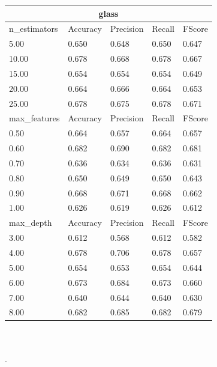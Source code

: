 \documentclass[12pt,a4paper]{article}
\begin{document}
\begin{tabular}{ |p{3cm}||p{2cm}|p{2cm}|p{2cm}|p{2cm}| }
\hline
\multicolumn{5}{|c|}{glass}\\
\hline
n\_estimators & Accuracy & Precision & Recall & FScore \\
\hline
5.00 & 0.650 & 0.648 & 0.650 & 0.647\\
10.00 & 0.678 & 0.668 & 0.678 & 0.667\\
15.00 & 0.654 & 0.654 & 0.654 & 0.649\\
20.00 & 0.664 & 0.666 & 0.664 & 0.653\\
25.00 & 0.678 & 0.675 & 0.678 & 0.671\\
\hline
max\_features & Accuracy & Precision & Recall & FScore \\
\hline
0.50 & 0.664 & 0.657 & 0.664 & 0.657\\
0.60 & 0.682 & 0.690 & 0.682 & 0.681\\
0.70 & 0.636 & 0.634 & 0.636 & 0.631\\
0.80 & 0.650 & 0.649 & 0.650 & 0.643\\
0.90 & 0.668 & 0.671 & 0.668 & 0.662\\
1.00 & 0.626 & 0.619 & 0.626 & 0.612\\
\hline
max\_depth & Accuracy & Precision & Recall & FScore \\
\hline
3.00 & 0.612 & 0.568 & 0.612 & 0.582\\
4.00 & 0.678 & 0.706 & 0.678 & 0.657\\
5.00 & 0.654 & 0.653 & 0.654 & 0.644\\
6.00 & 0.673 & 0.684 & 0.673 & 0.660\\
7.00 & 0.640 & 0.644 & 0.640 & 0.630\\
8.00 & 0.682 & 0.685 & 0.682 & 0.679\\
\hline
\end{tabular}
\\
\\.
\end{document}
